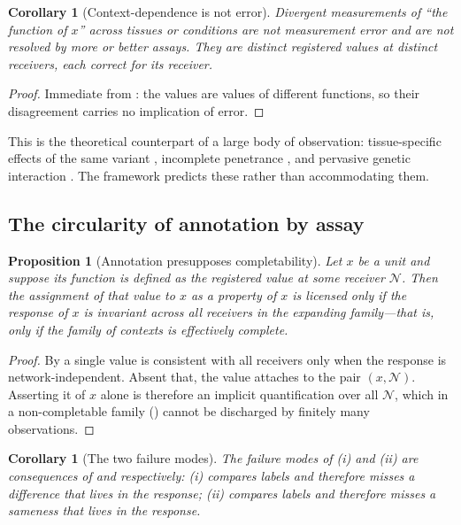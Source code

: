 \documentclass[11pt,twocolumn,a4paper]{article}
\newtheorem{proposition}[theorem]{Proposition}
\newtheorem{corollary}[theorem]{Corollary}
\theoremstyle{definition}
\theoremstyle{remark}
\newcommand{\netw}{\mathcal{N}}
\begin{document}
\begin{corollary}[Context-dependence is not error]
\label{cor:notnoise}
Divergent measurements of ``the function of $x$'' across tissues or
conditions are not measurement error and are not resolved by more or
better assays. They are distinct registered values at distinct receivers,
each correct for its receiver.
\end{corollary}

\begin{proof}
Immediate from : the values are values of different
functions, so their disagreement carries no implication of error.
\end{proof}

This is the theoretical counterpart of a large body of observation:
tissue-specific effects of the same variant \citep{gtex2020}, incomplete
penetrance \citep{cooper2013}, and pervasive genetic interaction
\citep{lehner2011,domingo2019,costanzo2016}. The framework predicts these
rather than accommodating them.

\subsection{The circularity of annotation by assay}

\begin{proposition}[Annotation presupposes completability]
\label{prop:circular}
Let $x$ be a unit and suppose its function is defined as the registered
value at some receiver $\netw$. Then the assignment of that value to $x$
as a property of $x$ is licensed only if the response of $x$ is invariant
across all receivers in the expanding family---that is, only if the family
of contexts is effectively complete.
\end{proposition}

\begin{proof}
By  a single value is consistent with all receivers
only when the response is network-independent. Absent that, the value
attaches to the pair $(x,\netw)$. Asserting it of $x$ alone is therefore
an implicit quantification over all $\netw$, which in a non-completable
family () cannot be discharged by finitely many
observations.
\end{proof}

\begin{corollary}[The two failure modes]
\label{cor:failures}
The failure modes of (i) and (ii) are consequences of
 and  respectively: (i) compares
labels and therefore misses a difference that lives in the response;
(ii) compares labels and therefore misses a sameness that lives in the
response.
\end{corollary}
\end{document}
